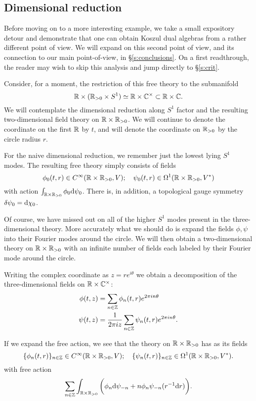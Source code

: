 \documentclass[11pt]{amsart}
\begin{document}
\subsection*{Dimensional reduction}

Before moving on to a more interesting example, we take a small expository detour and demonstrate that one can obtain Koszul dual algebras from a rather different point of view. We will expand on this second point of view, and its connection to our main point-of-view, in \S \ref{s:conclusions}. On a first readthrough, the reader may wish to skip this analysis and jump directly to \S \ref{s:crit}. 

Consider, for a moment, the restriction of this free theory to the submanifold 
\[
\mathbb R \times (\mathbb R_{>0} \times S^1) \simeq \mathbb R \times \mathbb C^\times \subset \mathbb R \times \mathbb C .
\]
We will contemplate the dimensional reduction along $S^1$ factor and the resulting two-dimensional field theory on $\mathbb R \times \mathbb R_{>0}$. 
We will continue to denote the coordinate on the first $\mathbb R$ by $t$, and will denote the coordinate on $\mathbb R_{>0}$ by the circle radius $r$.  

For the naive dimensional reduction, we remember just the lowest lying $S^1$ modes. 
The resulting free theory simply consists of fields
\[
\phi_0(t,r) \in C^\infty(\mathbb R \times \mathbb R_{>0} , V) ; \quad \psi_0 (t,r) \in \Omega^1 (\mathbb R \times \mathbb R_{>0}, V^*) 
\] 
with action $\int_{\mathbb R\times \mathbb R_{>0}} \phi_0 {\rm d} \psi_0$.
There is, in addition, a topological gauge symmetry $\delta \psi_0 = {\rm d} \chi_0$. 

Of course, we have missed out on all of the higher $S^1$ modes present in the three-dimensional theory. 
More accurately what we should do is expand the fields $\phi, \psi$ into their Fourier modes around the circle.
We will then obtain a two-dimensional theory on $\mathbb R \times \mathbb R_{>0}$ with an infinite number of fields each labeled by their Fourier mode around the circle. 

Writing the complex coordinate as $z = r e^{i \theta}$ we obtain a decomposition of the three-dimensional fields on $\mathbb R \times \mathbb C^\times$:
\begin{align*}
\phi(t,z) & = \sum_{n \in \mathbb Z} \phi_n (t,r) e^{2 \pi i n \theta} \\
\psi(t,z) & = \frac{1}{2 \pi i z} \sum_{n \in \mathbb Z} \psi_n(t, r) e^{2 \pi i n \theta} .
\end{align*}

If we expand the free action, we see that the theory on $\mathbb R \times \mathbb R_{>0}$ has as its fields 
\[
\{\phi_n(t,r)\}_{n \in \mathbb Z} \in C^\infty(\mathbb R \times \mathbb R_{>0} , V) ; \quad \{\psi_n (t,r)\}_{n \in \mathbb Z} \in \Omega^1 (\mathbb R \times \mathbb R_{>0}, V^*) .
\] 
with free action
\[
\sum_{n \in \mathbb Z} \int_{\mathbb R \times \mathbb R_{>0}} \bigg(\phi_n {\rm d} \psi_{-n} + n \phi_n \psi_{-n} (r^{-1} {\rm d} r)  \bigg).
\]
\end{document}
